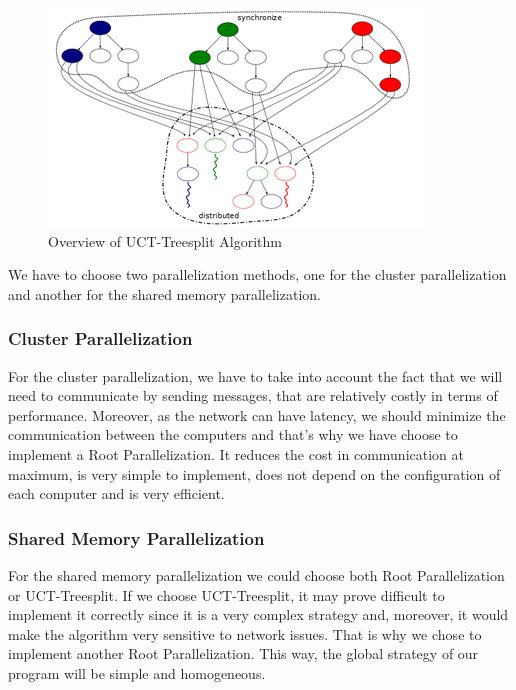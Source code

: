 \begin{figure}[!h] 
\centerline{\includegraphics[scale=0.60]{3Methods/3.1Parallelization_Method/treesplit.png}}
   \caption{\label{étiquette} Overview of UCT-Treesplit Algorithm}
\label{fig:treesplit}
\end{figure}


We have to choose two parallelization methods, one for the cluster parallelization and another for the shared memory parallelization.
\subsubsection{Cluster Parallelization}
For the cluster parallelization, we have to take into account the fact that we will need to communicate by sending messages, that are relatively costly in terms of performance.
Moreover, as the network can have latency, we should minimize the communication between the computers and that's why we have choose to implement a Root Parallelization.
It reduces the cost in communication at maximum, is very simple to implement, does not depend on the configuration of each computer and is very efficient.
\subsubsection{Shared Memory Parallelization}
For the shared memory parallelization we could choose both Root Parallelization or UCT-Treesplit.
If we choose UCT-Treesplit, it may prove difficult to implement it correctly since it is a very complex strategy and, moreover, it would make the algorithm very sensitive to network issues. That is why we chose to implement another Root Parallelization. This way, the global strategy of our program will be simple and homogeneous.
